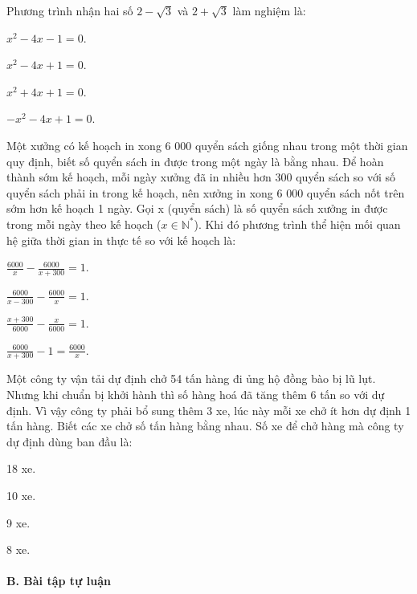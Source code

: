 \documentclass[%
    fontsize=12pt,%
    chapterprefix=false,%
    open=right,%
    twoside=false,%
    numbers=noenddot,%
    headings=optiontohead,%
    final,%
    DIV=15,%
    parskip=half %
]{scrbook}
\begin{document}
\begin{tracnghiem}
\item Phương trình nhận hai số $ 2 - \sqrt{3} $ và $ 2 + \sqrt{3} $ làm nghiệm là:
\begin{options}
  \item $ x^2 - 4x - 1 = 0. $
  \item $ x^2 - 4x + 1 = 0. $
  \item $ x^2 + 4x + 1 = 0. $
  \item $ -x^2 - 4x + 1 = 0. $
\end{options}

\item Một xưởng có kế hoạch in xong 6 000 quyển sách giống nhau trong một thời gian quy định, biết số quyển sách in được trong một ngày là bằng nhau. Để hoàn thành sớm kế hoạch, mỗi ngày xưởng đã in nhiều hơn 300 quyển sách so với số quyển sách phải in trong kế hoạch, nên xưởng in xong 6 000 quyển sách nốt trên sớm hơn kế hoạch 1 ngày. Gọi x (quyển sách) là số quyển sách xưởng in được trong mỗi ngày theo kế hoạch ($ x \in \mathbb{N}^* $). Khi đó phương trình thể hiện mối quan hệ giữa thời gian in thực tế so với kế hoạch là:
\begin{options}
  \item $ \frac{6000}{x} - \frac{6000}{x + 300} = 1. $
  \item $ \frac{6000}{x - 300} - \frac{6000}{x} = 1. $
  \item $ \frac{x + 300}{6000} - \frac{x}{6000} = 1. $
  \item $ \frac{6000}{x + 300} - 1 = \frac{6000}{x}. $
\end{options}

\item Một công ty vận tải dự định chở 54 tấn hàng đi ủng hộ đồng bào bị lũ lụt. Nhưng khi chuẩn bị khởi hành thì số hàng hoá đã tăng thêm 6 tấn so với dự định. Vì vậy công ty phải bổ sung thêm 3 xe, lúc này mỗi xe chở ít hơn dự định 1 tấn hàng. Biết các xe chở số tấn hàng bằng nhau. Số xe để chở hàng mà công ty dự định dùng ban đầu là:
\begin{options}
  \item 18 xe.
  \item 10 xe.
  \item 9 xe.
  \item 8 xe.
\end{options}

\end{tracnghiem}

\paragraph{B. Bài tập tự luận}
\end{document}
